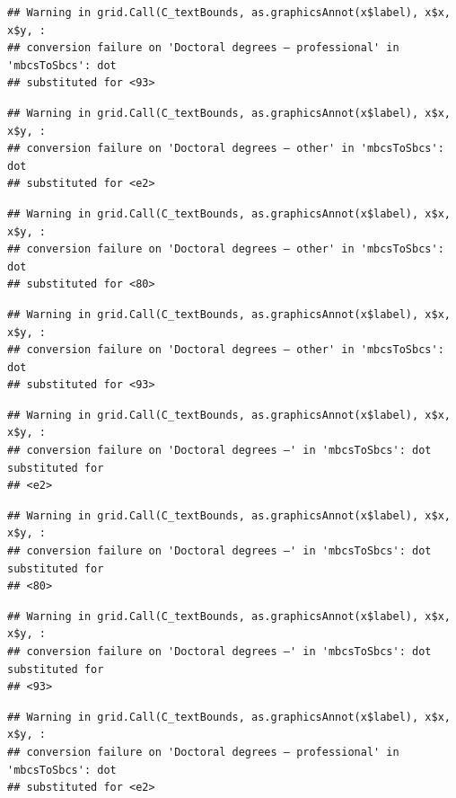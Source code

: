 \documentclass[
]{book}
\begin{document}
\begin{verbatim}
## Warning in grid.Call(C_textBounds, as.graphicsAnnot(x$label), x$x, x$y, :
## conversion failure on 'Doctoral degrees – professional' in 'mbcsToSbcs': dot
## substituted for <93>
\end{verbatim}

\begin{verbatim}
## Warning in grid.Call(C_textBounds, as.graphicsAnnot(x$label), x$x, x$y, :
## conversion failure on 'Doctoral degrees – other' in 'mbcsToSbcs': dot
## substituted for <e2>
\end{verbatim}

\begin{verbatim}
## Warning in grid.Call(C_textBounds, as.graphicsAnnot(x$label), x$x, x$y, :
## conversion failure on 'Doctoral degrees – other' in 'mbcsToSbcs': dot
## substituted for <80>
\end{verbatim}

\begin{verbatim}
## Warning in grid.Call(C_textBounds, as.graphicsAnnot(x$label), x$x, x$y, :
## conversion failure on 'Doctoral degrees – other' in 'mbcsToSbcs': dot
## substituted for <93>
\end{verbatim}

\begin{verbatim}
## Warning in grid.Call(C_textBounds, as.graphicsAnnot(x$label), x$x, x$y, :
## conversion failure on 'Doctoral degrees –' in 'mbcsToSbcs': dot substituted for
## <e2>
\end{verbatim}

\begin{verbatim}
## Warning in grid.Call(C_textBounds, as.graphicsAnnot(x$label), x$x, x$y, :
## conversion failure on 'Doctoral degrees –' in 'mbcsToSbcs': dot substituted for
## <80>
\end{verbatim}

\begin{verbatim}
## Warning in grid.Call(C_textBounds, as.graphicsAnnot(x$label), x$x, x$y, :
## conversion failure on 'Doctoral degrees –' in 'mbcsToSbcs': dot substituted for
## <93>
\end{verbatim}

\begin{verbatim}
## Warning in grid.Call(C_textBounds, as.graphicsAnnot(x$label), x$x, x$y, :
## conversion failure on 'Doctoral degrees – professional' in 'mbcsToSbcs': dot
## substituted for <e2>
\end{verbatim}
\end{document}
